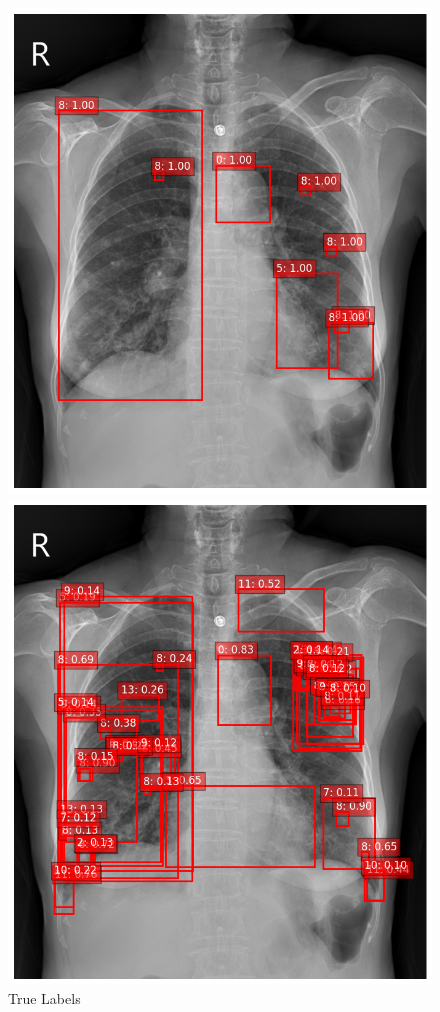 \documentclass[12pt,oneside]{book} %
\begin{document}
\begin{figure}[H]
    \centering
    \begin{minipage}[b]{0.45\textwidth}
        \includegraphics[width=\textwidth]{../results/true_labels.png}
        \caption{True Labels}
        \label{fig:true_labels}
    \end{minipage}
    \hfill %
    \begin{minipage}[b]{0.45\textwidth}
        \includegraphics[width=\textwidth]{../results/predictions.png}

\end{minipage}
\end{figure}
\end{document}
